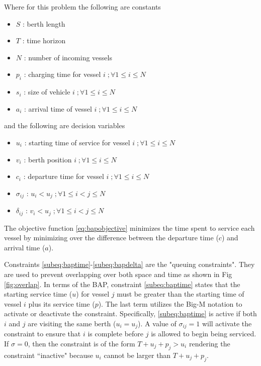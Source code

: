 \documentclass[letterpaper, 10pt, conference]{IEEEtran}
\begin{document}
\noindent
Where for this problem the following are constants

\begin{itemize}
	\item \(S\)   : berth length
	\item \(T\)   : time horizon
	\item \(N\)   : number of incoming vessels
	\item \(p_i\) : charging time for vessel \(i\;; \forall 1 \leq i \leq N\)
	\item \(s_i\) : size of vehicle \(i\;; \forall 1 \leq i \leq N\)
	\item \(a_i\) : arrival time of vessel \(i\;; \forall 1 \leq i \leq N\)
\end{itemize}

\noindent
and the following are decision variables

\begin{itemize}
    \item \(u_i\)         : starting time of service for vessel \(i\;; \forall 1 \leq i \leq N\)
    \item \(v_i\)         : berth position \(i\;; \forall 1 \leq i \leq N\)
    \item \(c_i\)         : departure time for vessel \(i\;; \forall 1 \leq i \leq N\)
    \item \(\sigma_{ij}\) : \(u_i < u_j\;; \forall 1 \leq i < j \leq N\)
    \item \(\delta_{ij}\) : \(v_i < u_j\;; \forall 1 \leq i < j \leq N\)
\end{itemize}

The objective function \eqref{eq:bapobjective} minimizes the time spent to service each vessel by minimizing over the difference between the departure time (\(c\)) and arrival time (\(a\)).

Constraints \ref{subeq:baptime}-\ref{subeq:bapdelta} are the "queuing constraints". They are used to prevent overlapping over both space and time as shown in Fig \ref{fig:overlap}. In terms of the BAP, constraint \eqref{subeq:baptime} states that the starting service time (\(u\)) for vessel \(j\) must be greater than the starting time of vessel \(i\) plus its service time (\(p\)). The last term utilizes the Big-M notation to activate or deactivate the constraint. Specifically, \eqref{subeq:baptime} is active if both \(i\) and \(j\) are visiting the same berth (\(u_i = u_j\)). A value of \(\sigma_{ij} = 1\) will activate the constraint to ensure that \(i\) is complete before \(j\) is allowed to begin being serviced. If \(\sigma = 0\), then the constraint is of the form \(T + u_j + p_j > u_i\) rendering the constraint ``inactive" because \(u_i\) cannot be larger than \(T + u_j + p_j\).
\end{document}
